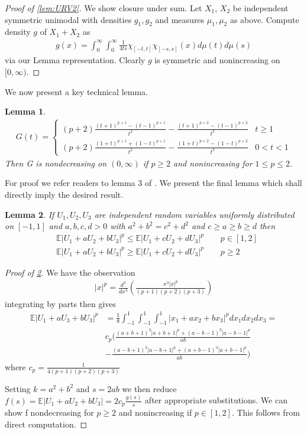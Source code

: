 \documentclass[10pt]{article}
\newcommand{\E}{\mathbb{E}}
\newcommand{\1}{\textbf{1}}
\newtheorem{lemma}{Lemma}[subsection]
\theoremstyle{remark}
\theoremstyle{definition}
\begin{document}
\begin{proof}[Proof of \ref{lem:URV2}]
	We show closure under sum. Let $X_1$, $X_2$ be independent symmetric unimodal with densities $g_1,g_2$ and measures $\mu_1,\mu_2$ as above. Compute density $g$ of $X_1 + X_2$ as 
	\begin{align*}
		g(x) = \int_0^{\infty} \int_0^{\infty} \frac{1}{4ts}\chi_{[-t,t]}  \chi_{[-s,s]}(x)d\mu(t)d\mu(s)
	\end{align*} via our Lemma representation. Clearly $g$ is symmetric and nonincreasing on $[0,\infty)$. 
\end{proof}

We now present a key technical lemma.

\begin{lemma}\label{lem:URV3}
	\begin{align*}
		G(t)=
		\begin{cases}
			(p+2)\frac{(t+1)^{p+1}-(t-1)^{p+1}}{t^2} - \frac{(t+1)^{p+2}-(t-1)^{p+2}}{t^3} & t \geq 1\\
			(p+2)\frac{(1+t)^{p+1}+(1-t)^{p+1}}{t^2} - \frac{(1+t)^{p+2}-(1-t)^{p+2}}{t^3} & 0 < t < 1
		\end{cases}
	\end{align*}
	Then G is nondecreasing on $(0,\infty)$ if $p \geq 2$ and nonincreasing for $1 \leq p \leq 2$. 
\end{lemma}

For proof we refer readers to lemma 3 of \cite{LO}. We present the final lemma which shall directly imply the desired result.

\begin{lemma}\label{lem:URV4}
	If $U_1,U_2,U_3$ are independent random variables uniformly distributed on $[-1,1]$ and $a,b,c,d > 0$ with $a^2 + b^2 = c^2 + d^2$ and $c \geq a \geq b \geq d$ then
	\begin{align*}
		&\E |U_1 + aU_2 + bU_3|^p \leq \E |U_1 + cU_2 + dU_3|^p \qquad p \in [1,2] \\
		&\E|U_1 + aU_2 + bU_3|^p \geq \E|U_1 + cU_2 + dU_3|^p \qquad p \geq 2
	\end{align*}
\end{lemma}

\begin{proof}[Proof of \ref{lem:URV4}]
	We have the observation 
	\begin{align*}
		|x|^p = \frac{d^3}{dx^3}(\frac{x^3|x|^p}{(p+1)(p+2)(p+3)})
	\end{align*}
	integrating by parts then gives
	\begin{align*}
		\E|U_1 + aU_3 + bU_3|^p &= \frac{1}{8}\int_{-1}^1\int_{-1}^1\int_{-1}^1|x_1 + ax_2 +bx_3|^p dx_1dx_2dx_3 =\\ &c_p(\frac{(a+b+1)^3|a+b+1|^p+(a-b-1)^3|a-b-1|^p}{ab} \\&- \frac{(a-b+1)^3|a-b+1|^p+(a+b-1)^3|a+b-1|^p}{ab})
	\end{align*}
	where $c_p = \frac{1}{4(p+1)(p+2)(p+3)}$

	Setting $k = a^2+b^2$ and $s = 2ab$ we then reduce $f(s) = \E|U_1+aU_2+bU_3| = 2c_p \frac{g(s)}{s}$ after appropriate substitutions. We can show f nondecreasing for $p \geq 2$ and nonincreasing if $p \in [1,2]$. This follows from direct computation.
\end{proof}
\end{document}

